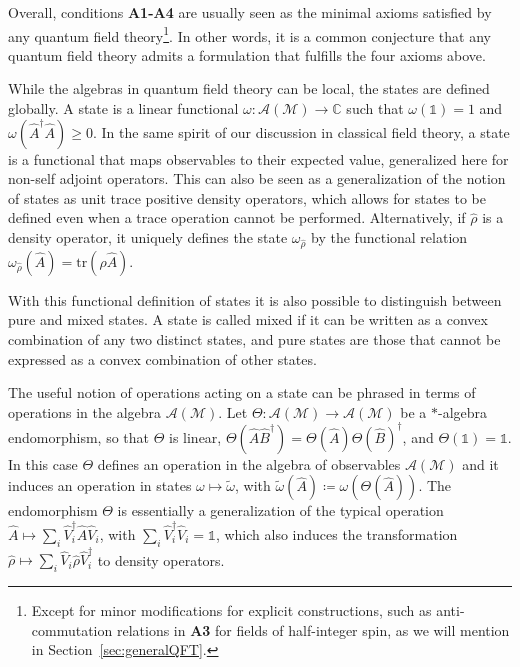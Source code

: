 \documentclass[letterpaper,12pt,titlepage,oneside,final]{book}
\newcommand{\openone}{\mathds{1}}
\newcommand{\M}{\mathcal{M}}
\begin{document}
Overall, conditions \textbf{A1-A4} are usually seen as the minimal axioms satisfied by any quantum field theory\footnote{Except for minor modifications for explicit constructions, such as anti-commutation relations in \textbf{A3} for fields of half-integer spin, as we will mention in Section~\ref{sec:generalQFT}.}. In other words, it is a common conjecture that any quantum field theory admits a formulation that fulfills the four axioms above. 

While the algebras in quantum field theory can be local, the states are defined globally. A state is a linear functional $\omega: \mathcal{A}(\M)\longrightarrow \mathbb{C}$ such that $\omega(\openone) = 1$ and $\omega(\hat{A}^\dagger \hat{A}) \geq 0$. In the same spirit of our discussion in classical field theory, a state is a functional that maps observables to their expected value, generalized here for non-self adjoint operators. This can also be seen as a generalization of the notion of states as unit trace positive density operators, which allows for states to be defined even when a trace operation cannot be performed. Alternatively, if $\hat{\rho}$ is a density operator, it uniquely defines the state $\omega_{\hat{\rho}}$ by the functional relation $\omega_{\hat{\rho}}(\hat{A}) = \text{tr}(\hat{\rho}\hat{A})$. 

With this functional definition of states it is also possible to distinguish between pure and mixed states. A state is called mixed if it can be written as a convex combination of any two distinct states, and pure states are those that cannot be expressed as a convex combination of other states. %

The useful notion of operations acting on a state can be phrased in terms of operations in the algebra $\mathcal{A}(\M)$. Let $\Theta:\mathcal{A}(\M)\rightarrow \mathcal{A}(\M)$ be a $\ast$-algebra endomorphism, so that $\Theta$ is linear, $\Theta(\hat{A}\hat{B}^\dagger) = \Theta(\hat{A})\Theta(\hat{B})^\dagger$, and $\Theta(\openone) = \openone$. In this case $\Theta$ defines an operation in the algebra of observables $\mathcal{A}(\M)$ and it induces an operation in states $\omega\mapsto \tilde{\omega}$, with $\tilde{\omega}(\hat{A}) \coloneqq \omega(\Theta(\hat{A}))$. The endomorphism $\Theta$ is essentially a generalization of the typical operation $\hat{A}\mapsto \sum_i \hat{V}_i^\dagger\hat{A}\hat{V}_i$, with $\sum_i \hat{V}_i^\dagger \hat{V}_i = \openone$, which also induces the transformation $\hat{\rho} \mapsto \sum_i\hat{V}_i\hat{\rho} \hat{V}_i^\dagger$ to density operators.
\end{document}
